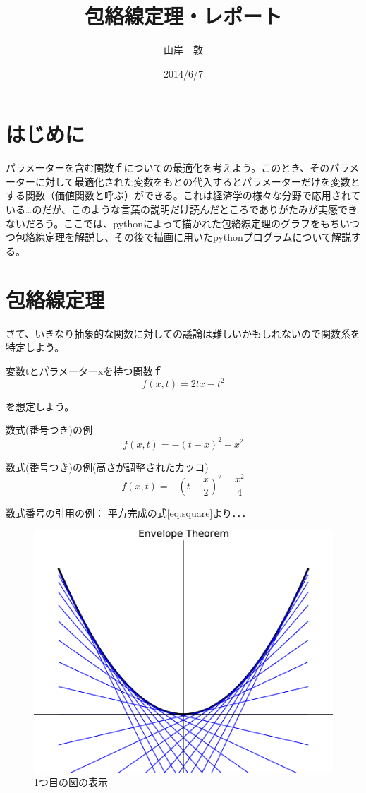 \documentclass[11pt,a4j,fleqn]{jarticle}
\title{包絡線定理・レポート}
\author{山岸　敦}
\date{2014/6/7}
\begin{document}
\maketitle

\section{はじめに}

パラメーターを含む関数ｆについての最適化を考えよう。このとき、そのパラメーターに対して最適化された変数をもとの代入するとパラメーターだけを変数とする関数（価値関数と呼ぶ）ができる。これは経済学の様々な分野で応用されている…のだが、このような言葉の説明だけ読んだところでありがたみが実感できないだろう。ここでは、pythonによって描かれた包絡線定理のグラフをもちいつつ包絡線定理を解説し、その後で描画に用いたpythonプログラムについて解説する。


\section{包絡線定理}

さて、いきなり抽象的な関数に対しての議論は難しいかもしれないので関数系を特定しよう。

変数tとパラメーターxを持つ関数ｆ
\[
f(x, t) =2 t x - t^2
\]

を想定しよう。

数式(番号つき)の例
\begin{equation}
f(x, t)  = -(t - x)^2 + x^2 \label{eq:square}
\end{equation}

数式(番号つき)の例(高さが調整されたカッコ)
\begin{equation}
f(x, t) = -\left(t - \frac{x}{2}\right)^2 + \frac{x^2}{4} \label{eq:square-2}
\end{equation}



数式番号の引用の例：
平方完成の式\eqref{eq:square}より．．．

\begin{figure}
\begin{center}
\includegraphics{envelope0.pdf}
\end{center}
\caption{1つ目の図の表示}
\label{fig:1}
\end{figure}
\end{document}
